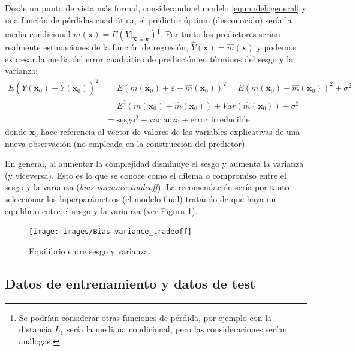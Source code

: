 \documentclass[
]{book}
\theoremstyle{break}
\theoremstyle{nonumberplain}
\begin{document}
Desde un punto de vista más formal, considerando el modelo \eqref{eq:modelogeneral} y una función de pérdidas cuadrática, el predictor óptimo (desconocido) sería la media condicional \(m(\mathbf{x}) = E\left( \left. Y\right\vert_{\mathbf{X}=\mathbf{x}} \right)\)\footnote{Se podrían considerar otras funciones de pérdida, por ejemplo con la distancia \(L_1\) sería la mediana condicional, pero las consideraciones serían análogas.}.
Por tanto los predictores serían realmente estimaciones de la función de regresión, \(\hat Y(\mathbf{x}) = \hat m(\mathbf{x})\) y podemos expresar la media del error cuadrático de predicción en términos del sesgo y la varianza: \[
\begin{aligned}
E \left( Y(\mathbf{x}_0) - \hat Y(\mathbf{x}_0) \right)^2 & = E \left( m(\mathbf{x}_0) + \varepsilon - \hat m(\mathbf{x}_0) \right)^2 = E \left( m(\mathbf{x}_0) - \hat m(\mathbf{x}_0) \right)^2 + \sigma^2 \\
& = E^2 \left( m(\mathbf{x}_0) - \hat m(\mathbf{x}_0) \right) + Var\left( \hat m(\mathbf{x}_0) \right) + \sigma^2 \\
& = \text{sesgo}^2 + \text{varianza} + \text{error irreducible}
\end{aligned}
\] donde \(\mathbf{x}_0\) hace referencia al vector de valores de las variables explicativas de una nueva observación (no empleada en la construcción del predictor).

En general, al aumentar la complejidad disminuye el sesgo y aumenta la varianza (y viceversa).
Esto es lo que se conoce como el dilema o compromiso entre el sesgo y la varianza (\emph{bias-variance tradeoff}).
La recomendación sería por tanto seleccionar los hiperparámetros (el modelo final) tratando de que haya un equilibrio entre el sesgo y la varianza (ver Figura \ref{fig:biasvar}).

\begin{figure}[!htb]

{\centering \texttt{[image: images/Bias-variance\_tradeoff]} 

}

\caption{Equilibrio entre sesgo y varianza.}\label{fig:biasvar}
\end{figure}

\hypertarget{entrenamiento-test}{%
\subsection{Datos de entrenamiento y datos de test}\label{entrenamiento-test}}
\end{document}
